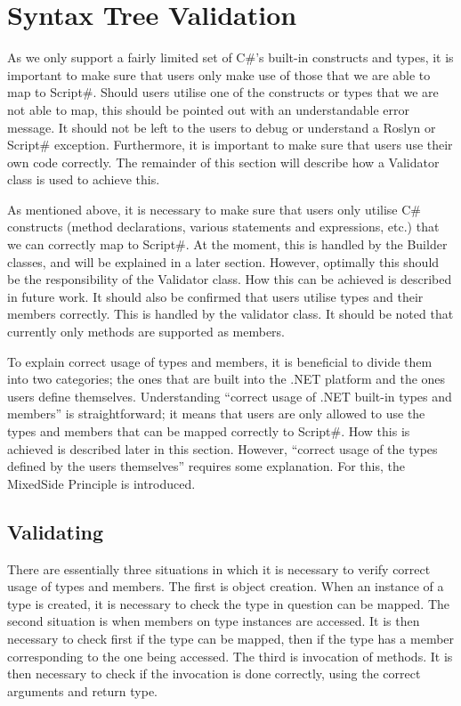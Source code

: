 \section{Syntax Tree Validation} %
\label{sec:syntax_tree_validation}
	As we only support a fairly limited set of C\#’s built-in constructs and types, it is important to make sure that users only make use of those that we are able to map to Script\#. Should users utilise one of the constructs or types that we are not able to map, this should be pointed out with an understandable error message. It should not be left to the users to debug or understand a Roslyn or Script\# exception. Furthermore, it is important to make sure that users use their own code correctly. The remainder of this section will describe how a Validator class is used to achieve this.

	As mentioned above, it is necessary to make sure that users only utilise C\# constructs (method declarations, various statements and expressions, etc.) that we can correctly map to Script\#. At the moment, this is handled by the Builder classes, and will be explained in a later section. However, optimally this should be the responsibility of the Validator class. How this can be achieved is described in future work. It should also be confirmed that users utilise types and their members correctly. This is handled by the validator class. It should be noted that currently only methods are supported as members.

	To explain correct usage of types and members, it is beneficial to divide them into two categories; the ones that are built into the .NET platform and the ones users define themselves. Understanding “correct usage of .NET built-in types and members” is straightforward; it means that users are only allowed to use the types and members that can be mapped correctly to Script\#. How this is achieved is described later in this section. However, “correct usage of the types defined by the users themselves” requires some explanation. For this, the MixedSide Principle is introduced.



	\subsection{Validating} %
	\label{sub:validating}

		There are essentially three situations in which it is necessary to verify correct usage of types and members. The first is object creation. When an instance of a type is created, it is necessary to check the type in question can be mapped. The second situation is when members on type instances are accessed. It is then necessary to check first if the type can be mapped, then if the type has a member corresponding to the one being accessed. The third is invocation of methods. It is then necessary to check if the invocation is done correctly, using the correct arguments and return type.


